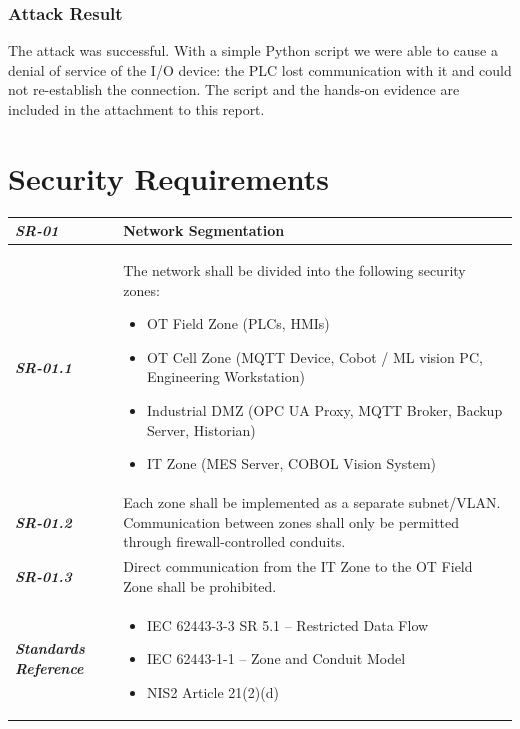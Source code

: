 \documentclass[11pt,a4paper]{article}
\begin{document}
\subsubsection{Attack Result}
The attack was successful. With a simple Python script we were
able to cause a denial of service of the I/O device: the PLC
lost communication with it and could not re-establish the
connection. The script and the hands-on evidence are included
in the attachment to this report.

\section{Security Requirements}
\begin{tabularx}
{\textwidth}{>{\bfseries}p{2.5cm} X}
\textit{SR-01} & \textbf{Network Segmentation} \vspace{0.5em}\\
\toprule
\textit{SR-01.1} &
The network shall be divided into the following security zones:
\begin{itemize}[label=-, itemsep=0pt, topsep=2pt]
    \item OT Field Zone (PLCs, HMIs)
    \item OT Cell Zone (MQTT Device, Cobot / ML vision PC, Engineering Workstation)
    \item Industrial DMZ (OPC UA Proxy, MQTT Broker, Backup Server, Historian)
    \item IT Zone (MES Server, COBOL Vision System)
\end{itemize} \vspace{0.5em}
\\
\textit{SR-01.2} &
Each zone shall be implemented as a separate subnet/VLAN.
Communication between zones shall only be permitted through
    firewall-controlled conduits. \vspace{0.5em}
\\
\textit{SR-01.3} &
Direct communication from the IT Zone to the OT Field Zone
    shall be prohibited. \vspace{0.5em}
\\
\midrule
    \textit{Standards Reference} &
\begin{itemize}[label=-, noitemsep, topsep=0pt, leftmargin=*]
    \item IEC 62443-3-3 SR 5.1 -- Restricted Data Flow
    \item IEC 62443-1-1 -- Zone and Conduit Model
    \item NIS2 Article 21(2)(d)
\end{itemize} \vspace{1em} \\ 
\end{tabularx}
\vspace{2em}
\end{document}
